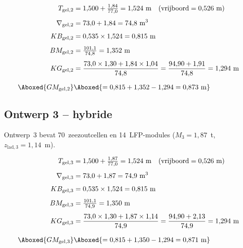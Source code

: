 \begin{align}
    T_{\mathrm{gel},2}      &= 1{,}500 + \tfrac{1{,}84}{77{,}0}
                             = 1{,}524\ \mathrm{m}
                             \quad(\text{vrijboord} = 0{,}526\ \mathrm{m}) \\[4pt]
    \nabla_{\mathrm{gel},2} &= 73{,}0 + 1{,}84 = 74{,}8\ \mathrm{m^3} \\[4pt]
    KB_{\mathrm{gel},2}     &= 0{,}535 \times 1{,}524 = 0{,}815\ \mathrm{m} \\[4pt]
    BM_{\mathrm{gel},2}     &= \tfrac{101{,}1}{74{,}8} = 1{,}352\ \mathrm{m} \\[4pt]
    KG_{\mathrm{gel},2}     &= \frac{73{,}0 \times 1{,}30 + 1{,}84 \times 1{,}04}
                                    {74{,}8}
                             = \frac{94{,}90 + 1{,}91}{74{,}8}
                             = 1{,}294\ \mathrm{m} \\[6pt]
    \Aboxed{GM_{\mathrm{gel},2}} &\Aboxed{= 0{,}815 + 1{,}352 - 1{,}294
                             = 0{,}873\ \mathrm{m}}
\end{align}

\subsection{Ontwerp 3 -- hybride}
\label{sec:stab_ontwerp3}

Ontwerp~3 bevat 70~zeezoutcellen en 14~LFP-modules
($M_3 = 1{,}87$~t, $z_\mathrm{lad,3} = 1{,}14$~m).

\begin{align}
    T_{\mathrm{gel},3}      &= 1{,}500 + \tfrac{1{,}87}{77{,}0}
                             = 1{,}524\ \mathrm{m}
                             \quad(\text{vrijboord} = 0{,}526\ \mathrm{m}) \\[4pt]
    \nabla_{\mathrm{gel},3} &= 73{,}0 + 1{,}87 = 74{,}9\ \mathrm{m^3} \\[4pt]
    KB_{\mathrm{gel},3}     &= 0{,}535 \times 1{,}524 = 0{,}815\ \mathrm{m} \\[4pt]
    BM_{\mathrm{gel},3}     &= \tfrac{101{,}1}{74{,}9} = 1{,}350\ \mathrm{m} \\[4pt]
    KG_{\mathrm{gel},3}     &= \frac{73{,}0 \times 1{,}30 + 1{,}87 \times 1{,}14}
                                    {74{,}9}
                             = \frac{94{,}90 + 2{,}13}{74{,}9}
                             = 1{,}294\ \mathrm{m} \\[6pt]
    \Aboxed{GM_{\mathrm{gel},3}} &\Aboxed{= 0{,}815 + 1{,}350 - 1{,}294
                             = 0{,}871\ \mathrm{m}}
\end{align}

